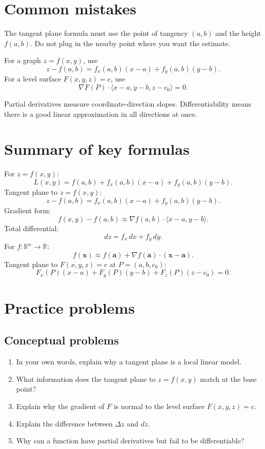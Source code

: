 \documentclass[11pt]{article}
\newcommand{\R}{\mathbb R}
\newcommand{\grad}{\nabla}
\begin{document}
\section{Common mistakes}

\begin{warningbox}
The tangent plane formula must use the point of tangency $(a,b)$ and the height $f(a,b)$. Do not plug in the nearby point where you want the estimate.
\end{warningbox}

\begin{warningbox}
For a graph $z=f(x,y)$, use
\[
z-f(a,b)=f_x(a,b)(x-a)+f_y(a,b)(y-b).
\]
For a level surface $F(x,y,z)=c$, use
\[
\grad F(P)\cdot \langle x-a,y-b,z-c_0\rangle=0.
\]
\end{warningbox}

\begin{warningbox}
Partial derivatives measure coordinate-direction slopes. Differentiability means there is a good linear approximation in all directions at once.
\end{warningbox}

\section{Summary of key formulas}

For $z=f(x,y)$:
\[
L(x,y)=f(a,b)+f_x(a,b)(x-a)+f_y(a,b)(y-b).
\]
Tangent plane to $z=f(x,y)$:
\[
z-f(a,b)=f_x(a,b)(x-a)+f_y(a,b)(y-b).
\]
Gradient form:
\[
f(x,y)-f(a,b)\approx \grad f(a,b)\cdot \langle x-a,y-b\rangle.
\]
Total differential:
\[
dz=f_x\,dx+f_y\,dy.
\]
For $f:\R^n\to\R$:
\[
f(\mathbf{x})\approx f(\mathbf{a})+\grad f(\mathbf{a})\cdot(\mathbf{x}-\mathbf{a}).
\]
Tangent plane to $F(x,y,z)=c$ at $P=(a,b,c_0)$:
\[
F_x(P)(x-a)+F_y(P)(y-b)+F_z(P)(z-c_0)=0.
\]

\section{Practice problems}

\subsection*{Conceptual problems}
\begin{enumerate}
  \item In your own words, explain why a tangent plane is a local linear model.
  \item What information does the tangent plane to $z=f(x,y)$ match at the base point?
  \item Explain why the gradient of $F$ is normal to the level surface $F(x,y,z)=c$.
  \item Explain the difference between $\Delta z$ and $dz$.
  \item Why can a function have partial derivatives but fail to be differentiable?
\end{enumerate}
\end{document}
